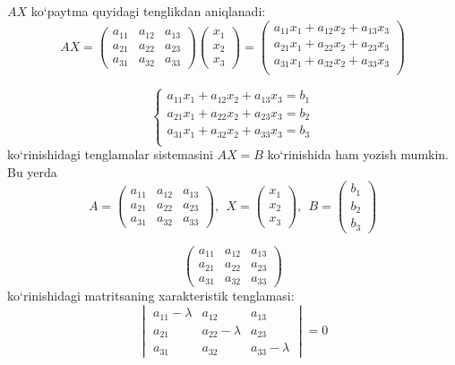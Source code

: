 $AX$ ko`paytma quyidagi tenglikdan aniqlanadi:
$$AX=\begin{pmatrix}
	a_{11}&a_{12}&a_{13}\\
	a_{21}&a_{22}&a_{23}\\
	a_{31}&a_{32}&a_{33}
\end{pmatrix}\begin{pmatrix}
x_1\\x_2\\x_3
\end{pmatrix}=\begin{pmatrix}
a_{11}x_1+a_{12}x_2+a_{13}x_3\\
a_{21}x_1+a_{22}x_2+a_{23}x_3\\
a_{31}x_1+a_{32}x_2+a_{33}x_3\\
\end{pmatrix}$$

$$\begin{cases}
	a_{11}x_1+a_{12}x_2+a_{13}x_3=b_1\\
	a_{21}x_1+a_{22}x_2+a_{23}x_3=b_2\\
	a_{31}x_1+a_{32}x_2+a_{33}x_3=b_3\\
\end{cases}$$
ko`rinishidagi tenglamalar sistemasini $AX=B$ ko`rinishida ham yozish mumkin. Bu yerda
$$A=\begin{pmatrix}
		a_{11}&a_{12}&a_{13}\\
	a_{21}&a_{22}&a_{23}\\
	a_{31}&a_{32}&a_{33}
\end{pmatrix},\ \ X=\begin{pmatrix}
x_1\\x_2\\x_3
\end{pmatrix},\ \ B=\begin{pmatrix}
b_1\\b_2\\b_3
\end{pmatrix}$$

$$\begin{pmatrix}
	a_{11}&a_{12}&a_{13}\\
	a_{21}&a_{22}&a_{23}\\
	a_{31}&a_{32}&a_{33}
\end{pmatrix}$$
ko`rinishidagi matritsaning xarakteristik tenglamasi:
$$\begin{vmatrix}
	a_{11}-\lambda&a_{12}&a_{13}\\
	a_{21}&a_{22}-\lambda&a_{23}\\
	a_{31}&a_{32}&a_{33}-\lambda
\end{vmatrix}=0$$

